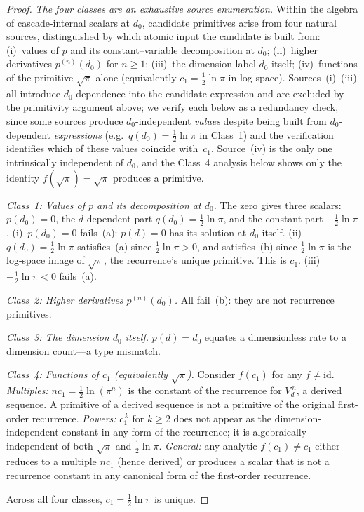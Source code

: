 \documentclass[11pt,a4paper]{article}
\begin{document}
\begin{proof}
\emph{The four classes are an exhaustive source enumeration.} Within
the algebra of cascade-internal scalars at $d_0$, candidate primitives
arise from four natural sources, distinguished by which atomic input
the candidate is built from:
(i)~values of $p$ and its constant--variable decomposition at $d_0$;
(ii)~higher derivatives $p^{(n)}(d_0)$ for $n\geq 1$;
(iii)~the dimension label $d_0$ itself;
(iv)~functions of the primitive $\sqrt{\pi}$ alone (equivalently
$c_1 = \tfrac{1}{2}\ln\pi$ in log-space).
Sources~(i)--(iii) all introduce $d_0$-dependence into the candidate
expression and are excluded by the primitivity argument above; we
verify each below as a redundancy check, since some sources produce
$d_0$-independent \emph{values} despite being built from $d_0$-dependent
\emph{expressions} (e.g.\ $q(d_0) = \tfrac{1}{2}\ln\pi$ in
Class~1) and the verification identifies which of these values
coincide with~$c_1$. Source~(iv) is the only one intrinsically
independent of $d_0$, and the Class~4 analysis below shows only the
identity $f(\sqrt{\pi}) = \sqrt{\pi}$ produces a primitive.

\emph{Class~1: Values of $p$ and its decomposition at $d_0$.} The zero
gives three scalars: $p(d_0) = 0$, the $d$-dependent part
$q(d_0) = \frac{1}{2}\ln\pi$, and the constant part
$-\frac{1}{2}\ln\pi$. (i)~$p(d_0) = 0$ fails~(a): $p(d) = 0$ has its
solution at $d_0$ itself. (ii)~$q(d_0) = \frac{1}{2}\ln\pi$ satisfies~(a)
since $\frac{1}{2}\ln\pi > 0$, and satisfies~(b) since
$\frac{1}{2}\ln\pi$ is the log-space image of $\sqrt{\pi}$, the
recurrence's unique primitive. This is $c_1$. (iii)~$-\frac{1}{2}\ln\pi < 0$
fails~(a).

\emph{Class~2: Higher derivatives $p^{(n)}(d_0)$.} All fail~(b): they are
not recurrence primitives.

\emph{Class~3: The dimension $d_0$ itself.} $p(d) = d_0$ equates a
dimensionless rate to a dimension count---a type mismatch.

\emph{Class~4: Functions of $c_1$ (equivalently $\sqrt{\pi}$).} Consider
$f(c_1)$ for any $f\neq\mathrm{id}$.
%
\emph{Multiples:} $n c_1 = \tfrac{1}{2}\ln(\pi^n)$ is the constant of
the recurrence for $V_d^{\,n}$, a derived sequence. A primitive of a
derived sequence is not a primitive of the original first-order recurrence.
%
\emph{Powers:} $c_1^{\,k}$ for $k\geq 2$ does not appear as the
dimension-independent constant in any form of the recurrence; it is
algebraically independent of both $\sqrt{\pi}$ and $\frac{1}{2}\ln\pi$.
%
\emph{General:} any analytic $f(c_1)\neq c_1$ either reduces to a
multiple $n c_1$ (hence derived) or produces a scalar that is not a
recurrence constant in any canonical form of the first-order recurrence.

Across all four classes, $c_1 = \frac{1}{2}\ln\pi$ is unique.
\end{proof}
\end{document}
